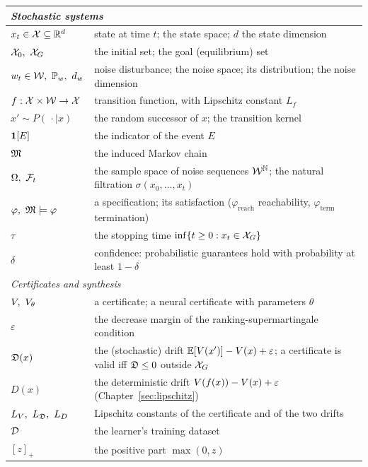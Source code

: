 \begin{center}
\mediumlinespacing
\begin{tabular}{lp{9.6cm}}
\hline
\multicolumn{2}{l}{\emph{Stochastic systems}}\\
\hline
$x_t \in \mathcal{X} \subseteq \mathbb{R}^d$ & state at time $t$; the state space; $d$ the state dimension \\
$\aX_0,\ \aX_G$ & the initial set; the goal (equilibrium) set \\
$w_t \in \aW,\ \prob_w,\ d_w$ & noise disturbance; the noise space; its distribution; the noise dimension \\
$f : \mathcal{X} \times \mathcal{W} \to \mathcal{X}$ & transition function, with Lipschitz constant $L_f$ \\
$x' \sim P(\,\cdot \mid x)$ & the random successor of $x$; the transition kernel \\
$\mathbf{1}[E]$ & the indicator of the event $E$ \\
$\mathfrak{M}$ & the induced Markov chain \\
$\Omega,\ \aF_t$ & the sample space of noise sequences $\mathcal{W}^{\mathbb{N}}$; the natural filtration $\sigma(x_0, \dots, x_t)$ \\
$\varphi,\ \mathfrak{M} \models \varphi$ & a specification; its satisfaction ($\varphi_{\mathrm{reach}}$ reachability, $\varphi_{\mathrm{term}}$ termination) \\
$\tau$ & the stopping time $\inf\{t \geq 0 : x_t \in \mathcal{X}_G\}$ \\
$\delta$ & confidence: probabilistic guarantees hold with probability at least $1-\delta$ \\
\hline
\multicolumn{2}{l}{\emph{Certificates and synthesis}}\\
\hline
$\cert,\ \cert_\theta$ & a certificate; a neural certificate with parameters $\theta$ \\
$\varepsilon$ & the decrease margin of the ranking-supermartingale condition \\
$\mathfrak{D}(x)$ & the (stochastic) drift $\mathbb{E}[V(x')] - V(x) + \varepsilon$; a certificate is valid iff $\mathfrak{D} \leq 0$ outside $\mathcal{X}_G$ \\
$D(x)$ & the deterministic drift $V(f(x)) - V(x) + \varepsilon$ (Chapter~\ref{sec:lipschitz}) \\
$L_\cert,\ L_\drift,\ L_D$ & Lipschitz constants of the certificate and of the two drifts \\
$\mathcal{D}$ & the learner's training dataset \\
$[z]_+$ & the positive part $\max(0, z)$ \\

\end{tabular}
\end{center}
